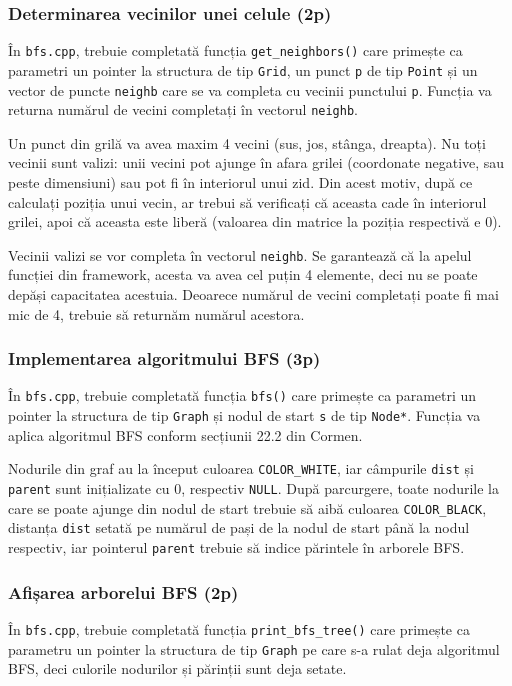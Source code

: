 \documentclass[../ro-fa-lab.tex]{subfiles}
\begin{document}
\subsubsection{Determinarea vecinilor unei celule (2p)}

În \texttt{bfs.cpp}, trebuie completată funcția \texttt{get\_neighbors()} care primește ca parametri un pointer la structura de tip \texttt{Grid}, un punct \texttt{p} de tip \texttt{Point} și un vector de puncte \texttt{neighb} care se va completa cu vecinii punctului \texttt{p}. Funcția va returna numărul de vecini completați în vectorul \texttt{neighb}.

Un punct din grilă va avea maxim 4 vecini (sus, jos, stânga, dreapta). Nu toți vecinii sunt valizi: unii vecini pot ajunge în afara grilei (coordonate negative, sau peste dimensiuni) sau pot fi în interiorul unui zid. Din acest motiv, după ce calculați poziția unui vecin, ar trebui să verificați că aceasta cade în interiorul grilei, apoi că aceasta este liberă (valoarea din matrice la poziția respectivă e 0).

Vecinii valizi se vor completa în vectorul \texttt{neighb}. Se garantează că la apelul funcției din framework, acesta va avea cel puțin 4 elemente, deci nu se poate depăși capacitatea acestuia. Deoarece numărul de vecini completați poate fi mai mic de 4, trebuie să returnăm numărul acestora.

\subsubsection{Implementarea algoritmului BFS (3p)}
În \texttt{bfs.cpp}, trebuie completată funcția \texttt{bfs()} care primește ca parametri un pointer la structura de tip \texttt{Graph} și nodul de start \texttt{s} de tip \texttt{Node*}. Funcția va aplica algoritmul BFS conform secțiunii 22.2 din Cormen.

Nodurile din graf au la început culoarea \texttt{COLOR\_WHITE}, iar câmpurile \texttt{dist} și \texttt{parent} sunt inițializate cu 0, respectiv \texttt{NULL}. După parcurgere, toate nodurile la care se poate ajunge din nodul de start trebuie să aibă culoarea \texttt{COLOR\_BLACK}, distanța \texttt{dist} setată pe numărul de pași de la nodul de start până la nodul respectiv, iar pointerul \texttt{parent} trebuie să indice părintele în arborele BFS.

\subsubsection{Afișarea arborelui BFS (2p)}
În \texttt{bfs.cpp}, trebuie completată funcția \texttt{print\_bfs\_tree()} care primește ca parametru un pointer la structura de tip \texttt{Graph} pe care s-a rulat deja algoritmul BFS, deci culorile nodurilor și părinții sunt deja setate.
\end{document}
